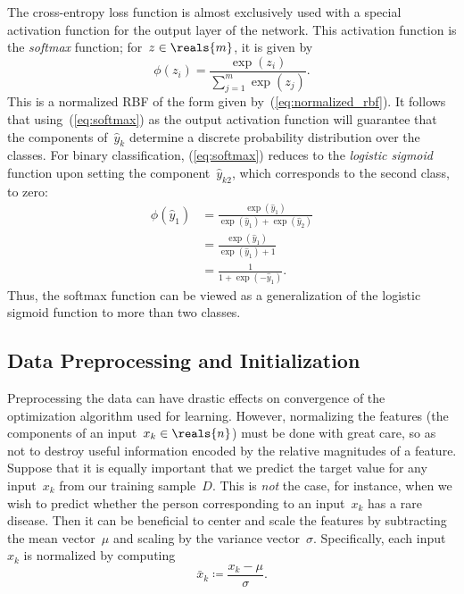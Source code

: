\documentclass[11pt,a4paper]{article}
\numberwithin{equation}{section}
\begin{document}
The cross-entropy loss function is almost exclusively used with a special
activation function for the output layer of the network. This activation
function is the \emph{softmax} function; for~$z \in \reals{m}$, it is given by
\begin{equation}
	\phi(z_i) = \frac{\exp(z_i)}{\sum_{j = 1}^m \exp(z_j)}.
	\label{eq:softmax}
\end{equation}
This is a normalized RBF of the form given by~(\ref{eq:normalized_rbf}). It
follows that using~(\ref{eq:softmax}) as the output activation function will
guarantee that the components of~$\hat{y}_k$ determine a discrete probability
distribution over the classes. For binary classification, (\ref{eq:softmax})
reduces to the \emph{logistic sigmoid} function upon setting the
component~$\hat{y}_{k2}$, which corresponds to the second class, to zero:
\begin{align*}
	\phi(\hat{y}_1)
	&= \frac{\exp(\hat{y}_1)}{\exp(\hat{y}_1) + \exp(\hat{y}_2)} \\
	&= \frac{\exp(\hat{y}_1)}{\exp(\hat{y}_1) + 1} \\
	&= \frac{1}{1 + \exp(-\hat{y}_1)}.
\end{align*}
Thus, the softmax function can be viewed as a generalization of the logistic
sigmoid function to more than two classes.

\subsection{Data Preprocessing and Initialization}
\label{sec:pp_and_init}

Preprocessing the data can have drastic effects on convergence of the
optimization algorithm used for learning. However, normalizing the features (the
components of an input~$x_k \in \reals{n}$) must be done with great care, so as
not to destroy useful information encoded by the relative magnitudes of a
feature. Suppose that it is equally important that we predict the target value
for any input~$x_k$ from our training sample~$D$. This is \emph{not} the case,
for instance, when we wish to predict whether the person corresponding to an
input~$x_k$ has a rare disease. Then it can be beneficial to center and scale
the features by subtracting the mean vector~$\mu$ and scaling by the variance
vector~$\sigma$. Specifically, each input~$x_k$ is normalized by computing
\begin{equation}
	\bar{x}_k \coloneqq \frac{x_k - \mu}{\sigma}.
	\label{eq:center_and_scale}
\end{equation}
\end{document}
